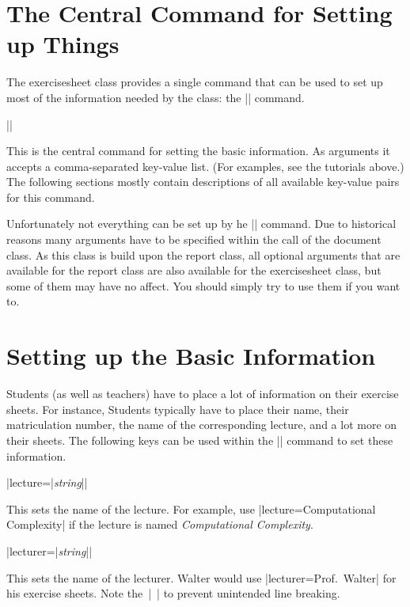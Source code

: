 \documentclass[a4paper,fleqn]{report}
\def\exercisesheet{{exercisesheet}}
\def\syntaxdefaultarg#1{\hfill\texttt{\small #1}\par\smallskip\noindent\ignorespaces}
\def\metaargument#1{\textit{\small #1}}
\begin{document}
\section{The Central Command for Setting up Things}

The \exercisesheet{} class provides a single command that can be used
to set up most of the information needed by the class: the
|\sheetconf| command.

\begin{syntax}
  |\sheetconf{|\metaargument{key-value list}|}|
  \syntaxdefaultarg{}
  This is the central command for setting the basic information. As
  arguments it accepts a comma-separated key-value list. (For
  examples, see the tutorials above.) The following sections mostly
  contain descriptions of all available key-value pairs for this
  command.

\end{syntax}

\noindent Unfortunately not everything can be set up by he
|\sheetconf| command. Due to historical reasons many arguments have to
be specified within the call of the document class. As this class is
build upon the report class, all optional arguments that are available
for the report class are also available for the \exercisesheet{}
class, but some of them may have no affect. You should simply try to
use them if you want to.


\section{Setting up the Basic Information}

Students (as well as teachers) have to place a lot of information on
their exercise sheets. For instance, Students typically have to place
their name, their matriculation number, the name of the corresponding
lecture, and a lot more on their sheets. The following keys can be
used within the |\sheetconf| command to set these information.

\begin{syntax}
  |lecture={|\metaargument{string}|}| \syntaxdefaultarg{}
  This sets the name of the lecture. For example, use
  |lecture={Computational Complexity}| if the lecture is named
  \emph{Computational Complexity}.
\end{syntax}

\begin{syntax}
  |lecturer={|\metaargument{string}|}| \syntaxdefaultarg{}
  This sets the name of the lecturer. Walter would use
  |lecturer={Prof.~Walter}| for his exercise sheets. Note the~|~|
  to prevent unintended line breaking.
\end{syntax}
\end{document}
